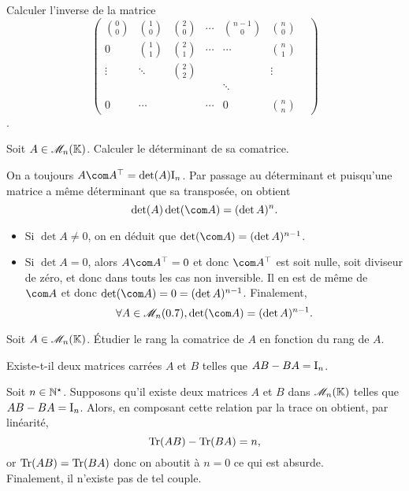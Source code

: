 \begin{exercice}
    Calculer l'inverse de la matrice
    $$
    \begin{pmatrix}
        \binom{0}{0} & \binom{1}{0} & \binom{2}{0} & \cdots & \binom{n-1}{0} & \binom{n}{0} \\
        0 & \binom{1}{1} & \binom{2}{1} & \cdots & \cdots & \binom{n}{1} \\
        \vdots & \ddots & \binom{2}{2} & & & \vdots \\
        & & & & \ddots & & \\
        & & & & & & \\
        0 & \cdots & & \cdots & 0 & \binom{n}{n}
    \end{pmatrix}
    $$.
\end{exercice}

\begin{exercice}
    Soit $A \in \mathscr{M}_n(\mathbb{K})$. Calculer le déterminant de sa comatrice. 
\end{exercice}

\begin{solution}
    On a toujours $A \Trsp{\com A} = \det(A) \I_n$. Par passage au déterminant et puisqu'une matrice a même déterminant que sa transposée, on obtient
    $$\det(A) \det (\com A) = (\det A)^n.$$
    \begin{itemize}
        \item Si $\det A \not = 0$, on en déduit que $\det(\com A) = (\det A)^{n-1}$.
        \item Si $\det A = 0$, alors $A \Trsp{\com A} = 0$ et donc $\Trsp{\com A}$ est soit nulle, soit diviseur de zéro, et donc dans touts les cas non inversible. Il en est de même de $\com A$ et donc $\det (\com A) = 0 = (\det A)^{n-1}$. Finalement,
        $$\forall A \in \M_n(\R), \det(\com A) = (\det A)^{n-1}.$$
    \end{itemize}
\end{solution}

\begin{exercice}
    Soit $A \in \mathscr{M}_n(\mathbb{K})$. Étudier le rang la comatrice de $A$ en fonction du rang de $A$.
\end{exercice}

\begin{exercice}
    Existe-t-il deux matrices carrées $A$ et $B$ telles que $AB-BA = \mathrm{I}_n$.
\end{exercice}

\begin{solution}
    Soit $n \in \mathbb{N}^\star$. Supposons qu'il existe deux matrices $A$ et $B$ dans $\mathscr{M}_n(\mathbb{K})$ telles que $AB-BA=\mathrm{I}_n$. Alors, en composant cette relation par la trace on obtient, par linéarité,
    $$\Tr(AB) - \Tr(BA) = n, $$
    or $\Tr(AB) = \Tr(BA)$ donc on aboutit à $n = 0$ ce qui est absurde. \\
    Finalement, il n'existe pas de tel couple. 
\end{solution}

